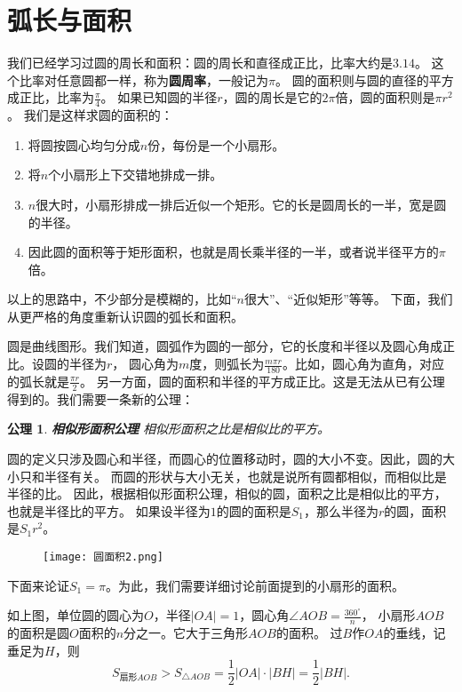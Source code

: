 \documentclass[12pt,UTF8]{ctexbook}
\newtheorem{po}{公理}
\begin{document}
\section{弧长与面积}
我们已经学习过圆的周长和面积：圆的周长和直径成正比，比率大约是$3.14$。
这个比率对任意圆都一样，称为\textbf{圆周率}，一般记为$\pi$。
圆的面积则与圆的直径的平方成正比，比率为$\frac{\pi}{4}$。
如果已知圆的半径$r$，圆的周长是它的$2\pi$倍，圆的面积则是$\pi r^2$。
我们是这样求圆的面积的：
\begin{enumerate}
    \item 将圆按圆心均匀分成$n$份，每份是一个小扇形。
    \item 将$n$个小扇形上下交错地排成一排。
    \item $n$很大时，小扇形排成一排后近似一个矩形。它的长是圆周长的一半，宽是圆的半径。
    \item 因此圆的面积等于矩形面积，也就是周长乘半径的一半，或者说半径平方的$\pi$倍。
\end{enumerate}

以上的思路中，不少部分是模糊的，比如“$n$很大”、“近似矩形”等等。
下面，我们从更严格的角度重新认识圆的弧长和面积。

圆是曲线图形。我们知道，圆弧作为圆的一部分，它的长度和半径以及圆心角成正比。设圆的半径为$r$，
圆心角为$m$度，则弧长为$\frac{m\pi r}{180}$。比如，圆心角为直角，对应的弧长就是$\frac{\pi r}{2}$。
另一方面，圆的面积和半径的平方成正比。这是无法从已有公理得到的。我们需要一条新的公理：

\begin{po}{\textbf{相似形面积公理}}
    相似形面积之比是相似比的平方。
\end{po}

圆的定义只涉及圆心和半径，而圆心的位置移动时，圆的大小不变。因此，圆的大小只和半径有关。
而圆的形状与大小无关，也就是说所有圆都相似，而相似比是半径的比。
因此，根据相似形面积公理，相似的圆，面积之比是相似比的平方，也就是半径比的平方。
如果设半径为$1$的圆的面积是$S_1$，那么半径为$r$的圆，面积是$S_1r^2$。

\begin{figure}[H] 
    \vspace{4pt}
    \centering
    \texttt{[image: 圆面积2.png]}
\end{figure}

下面来论证$S_1 = \pi$。为此，我们需要详细讨论前面提到的小扇形的面积。

如上图，单位圆的圆心为$O$，半径$|OA|=1$，圆心角$\angle AOB = \frac{360^\circ}{n}$，
小扇形$AOB$的面积是圆$O$面积的$n$分之一。它大于三角形$AOB$的面积。
过$B$作$OA$的垂线，记垂足为$H$，则
$$ S_{\text{扇形}AOB} > S_{\triangle AOB} = \frac12 |OA| \cdot |BH| = \frac12 |BH|. $$
\end{document}
